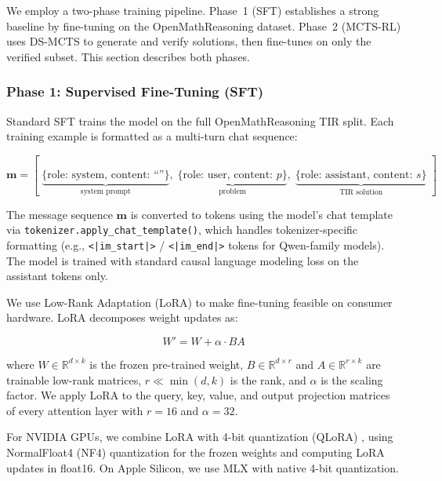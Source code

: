 \documentclass[11pt,a4paper]{article}
\begin{document}
We employ a two-phase training pipeline. Phase~1 (SFT) establishes a strong
baseline by fine-tuning on the OpenMathReasoning dataset. Phase~2 (MCTS-RL)
uses DS-MCTS to generate and verify solutions, then fine-tunes on only the
verified subset. This section describes both phases.

\subsubsection{Phase 1: Supervised Fine-Tuning (SFT)}

Standard SFT trains the model on the full OpenMathReasoning TIR split. Each
training example is formatted as a multi-turn chat sequence:

\begin{equation}
\mathbf{m} = \left[\;
\underbrace{\{\text{role: system, content: ``''}\}}_{\text{system prompt}}, \;
\underbrace{\{\text{role: user, content: } p\}}_{\text{problem}}, \;
\underbrace{\{\text{role: assistant, content: } s\}}_{\text{TIR solution}}
\;\right]
\end{equation}

The message sequence $\mathbf{m}$ is converted to tokens using the model's
chat template via \texttt{tokenizer.apply\_chat\_template()}, which
handles tokenizer-specific formatting (e.g., \texttt{<|im\_start|>} /
\texttt{<|im\_end|>} tokens for Qwen-family models). The model is trained with
standard causal language modeling loss on the assistant tokens only.

We use Low-Rank Adaptation (LoRA) \citep{hu2022lora} to make fine-tuning
feasible on consumer hardware. LoRA decomposes weight updates as:

\begin{equation}
W' = W + \alpha \cdot BA
\end{equation}

\noindent where $W \in \mathbb{R}^{d \times k}$ is the frozen pre-trained
weight, $B \in \mathbb{R}^{d \times r}$ and $A \in \mathbb{R}^{r \times k}$
are trainable low-rank matrices, $r \ll \min(d, k)$ is the rank, and $\alpha$
is the scaling factor. We apply LoRA to the query, key, value, and output
projection matrices of every attention layer with $r = 16$ and $\alpha = 32$.

For NVIDIA GPUs, we combine LoRA with 4-bit quantization (QLoRA)
\citep{dettmers2023qlora}, using NormalFloat4 (NF4) quantization for the frozen
weights and computing LoRA updates in float16. On Apple Silicon, we use MLX
\citep{mlx2023} with native 4-bit quantization.
\end{document}
